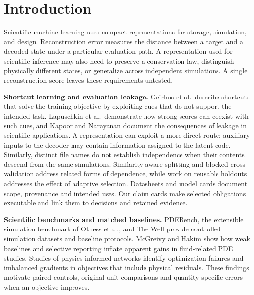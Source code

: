 \documentclass[10pt,a4paper,twocolumn]{article}
\begin{document}
\section{Introduction}

Scientific machine learning uses compact representations for storage, simulation, and design. Reconstruction error measures the distance between a target and a decoded state under a particular evaluation path. A representation used for scientific inference may also need to preserve a conservation law, distinguish physically different states, or generalize across independent simulations. A single reconstruction score leaves these requirements untested.

\textbf{Shortcut learning and evaluation leakage.}
Geirhos et al.\ describe shortcuts that solve the training objective by exploiting cues that do not support the intended task.\cite{geirhos} Lapuschkin et al.\ demonstrate how strong scores can coexist with such cues,\cite{lapuschkin} and Kapoor and Narayanan document the consequences of leakage in scientific applications.\cite{kapoor} A representation can exploit a more direct route: auxiliary inputs to the decoder may contain information assigned to the latent code. Similarly, distinct file names do not establish independence when their contents descend from the same simulations. Similarity-aware splitting and blocked cross-validation address related forms of dependence,\cite{datasail,roberts} while work on reusable holdouts addresses the effect of adaptive selection.\cite{dwork} Datasheets and model cards document scope, provenance and intended uses.\cite{gebru,mitchell} Our claim cards make selected obligations executable and link them to decisions and retained evidence.

\textbf{Scientific benchmarks and matched baselines.}
PDEBench, the extensible simulation benchmark of Otness et al., and The Well provide controlled simulation datasets and baseline protocols.\cite{pdebench,otness,well} McGreivy and Hakim show how weak baselines and selective reporting inflate apparent gains in fluid-related PDE studies.\cite{mcgreivy} Studies of physics-informed networks identify optimization failures and imbalanced gradients in objectives that include physical residuals.\cite{krishna,wang} These findings motivate paired controls, original-unit comparisons and quantity-specific errors when an objective improves.
\end{document}
